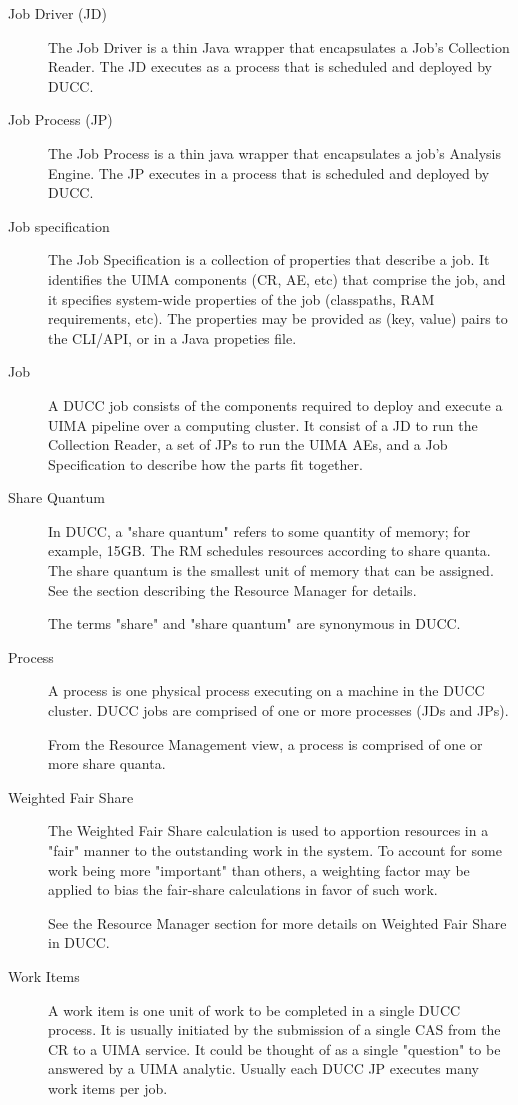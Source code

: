 \begin{description}
\item[Job Driver (JD)]The Job Driver is a thin Java wrapper that encapsulates a Job's Collection
  Reader. The JD executes as a process that is scheduled and deployed by DUCC.

\item[Job Process (JP) ]The Job Process is a thin java wrapper that encapsulates a job's Analysis
  Engine. The JP executes in a process that is scheduled and deployed by DUCC.

\item[Job specification ]The Job Specification is a collection of properties that describe a job. It
  identifies the UIMA components (CR, AE, etc) that comprise the job, and it specifies system-wide
  properties of the job (classpaths, RAM requirements, etc). The properties may be provided as (key,
  value) pairs to the CLI/API, or in a Java propeties file.

\item[Job ] A DUCC job consists of the components required to deploy and execute a UIMA pipeline over
  a computing cluster. It consist of a JD to run the Collection Reader, a set of JPs to run the UIMA
  AEs, and a Job Specification to describe how the parts fit together.

\item[Share Quantum ] In DUCC, a "share quantum" refers to some quantity of memory; for example,
  15GB. The RM schedules resources according to share quanta. The share quantum is the smallest unit
  of memory that can be assigned. See the section describing the Resource Manager for details.

  The terms "share" and "share quantum" are synonymous in DUCC. 

\item[Process ]A process is one physical process executing on a machine in the DUCC cluster. DUCC
  jobs are comprised of one or more processes (JDs and JPs).

  From the Resource Management view, a process is comprised of one or more share quanta. 

\item[Weighted Fair Share ] The Weighted Fair Share calculation is used to apportion resources in a
  "fair" manner to the outstanding work in the system. To account for some work being more
  "important" than others, a weighting factor may be applied to bias the fair-share calculations in
  favor of such work.

  See the Resource Manager section for more details on Weighted Fair Share in DUCC. 

\item[Work Items ] A work item is one unit of work to be completed in a single DUCC process. It is
  usually initiated by the submission of a single CAS from the CR to a UIMA service. It could be
  thought of as a single "question" to be answered by a UIMA analytic. Usually each DUCC JP executes
  many work items per job.
\end{description}

